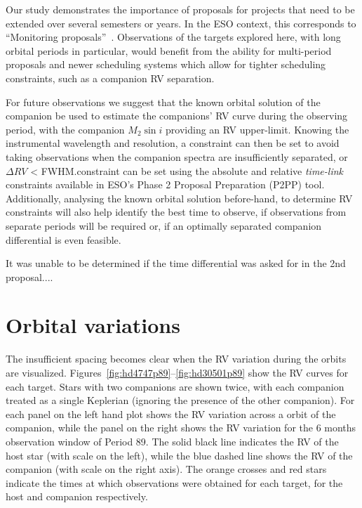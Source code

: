 Our study demonstrates the importance of proposals for projects that need to be extended over several semesters or years. In the ESO context, this corresponds to ``Monitoring proposals''~\citep[e.g.,][pg. 18]{eso_eso_2017}.
Observations of the targets explored here, with long orbital periods in particular, would benefit from the ability for multi-period proposals and newer scheduling systems which allow for tighter scheduling constraints, such as a companion {RV} separation.

For future observations we suggest that the known orbital solution of the companion be used to estimate the companions' {RV} curve during the observing period, with the companion \(M_2\sin{i}\) providing an {RV} upper-limit.
Knowing the instrumental wavelength and resolution, a constraint can then be set to avoid taking observations when the companion spectra are insufficiently separated, or \(\Delta {RV}\) < {FWHM}.\@This constraint can be set using the absolute and relative \emph{time-link} constraints available in {ESO}'s {Phase 2 Proposal Preparation} (P2PP) tool.
Additionally, analysing the known orbital solution before-hand, to determine {RV} constraints will also help identify the best time to observe, if observations from separate periods will be required or, if an optimally separated companion differential is even feasible.


It was unable to be determined if the time differential was asked for in the 2nd proposal....


\section{Orbital variations}

The insufficient spacing becomes clear when the RV variation during the orbits are visualized. Figures~\ref{fig:hd4747p89}--\ref{fig:hd30501p89} show the RV curves for each target.
Stars with two companions are shown twice, with each companion treated as a single Keplerian (ignoring the presence of the other companion).
For each panel on the left hand plot shows the RV variation across a orbit of the companion, while the panel on the right shows the RV variation for the 6 months observation window of Period 89.
The solid black line indicates the RV of the host star (with scale on the left), while the blue dashed line shows the RV of the companion (with scale on the right axis).
The orange crosses and red stars indicate the times at which observations were obtained for each target, for the host and companion respectively.

